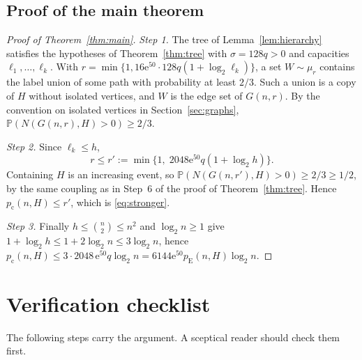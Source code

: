 \documentclass[11pt]{article}
\numberwithin{equation}{section}
\theoremstyle{remark}
\newcommand{\PP}{\mathbb P}
\newcommand{\pc}{p_{\mathrm c}}
\newcommand{\pE}{p_{\mathrm E}}
\newcommand{\ee}{\mathrm e}
\begin{document}
\subsection{Proof of the main theorem}

\begin{proof}[Proof of Theorem~\ref{thm:main}]
\emph{Step 1.} The tree of Lemma~\ref{lem:hierarchy} satisfies the
hypotheses of Theorem~\ref{thm:tree} with $\sigma=128q>0$ and capacities
$\ell_1,\ldots,\ell_k$. With
$r=\min\{1,16\ee^{50}\cdot128q(1+\log_2\ell_k)\}$, a set $W\sim\mu_r$
contains the label union of some path with probability at least $2/3$.
Such a union is a copy of $H$ without isolated vertices, and $W$ is the
edge set of $G(n,r)$. By the convention on isolated vertices in
Section~\ref{sec:graphs},
$\PP(N(G(n,r),H)>0)\ge2/3$.

\emph{Step 2.} Since $\ell_k\le h$,
\[
 r\le r':=\min\{1,\;2048\ee^{50}q(1+\log_2 h)\}.
\]
Containing $H$ is an increasing event, so
$\PP(N(G(n,r'),H)>0)\ge2/3\ge1/2$, by the same coupling as in Step~6 of
the proof of Theorem~\ref{thm:tree}. Hence $\pc(n,H)\le r'$, which is
\eqref{eq:stronger}.

\emph{Step 3.} Finally $h\le\binom n2\le n^2$ and $\log_2n\ge1$ give
$1+\log_2h\le1+2\log_2n\le3\log_2n$, hence
$\pc(n,H)\le3\cdot2048\,\ee^{50}q\log_2n=6144\ee^{50}\pE(n,H)\log_2n$.
\end{proof}

\section{Verification checklist}

The following steps carry the argument. A sceptical reader should check
them first.
\end{document}
